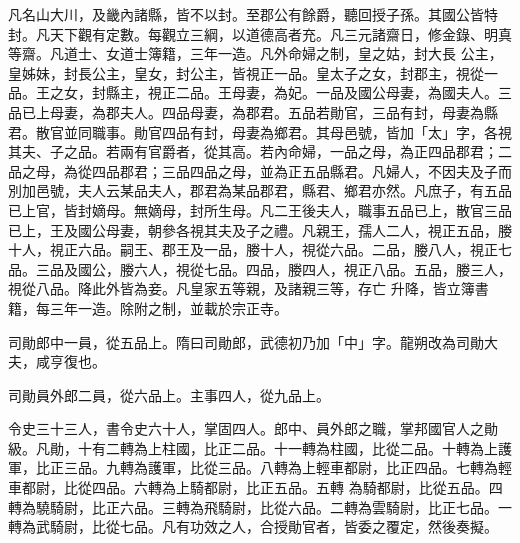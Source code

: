 \begin{pinyinscope}
 凡名山大川，及畿內諸縣，皆不以封。至郡公有餘爵，聽回授子孫。其國公皆特封。凡天下觀有定數。每觀立三綱，以道德高者充。凡三元諸齋日，修金錄、明真等齋。凡道士、女道士簿籍，三年一造。凡外命婦之制，皇之姑，封大長
 公主，皇姊妹，封長公主，皇女，封公主，皆視正一品。皇太子之女，封郡主，視從一品。王之女，封縣主，視正二品。王母妻，為妃。一品及國公母妻，為國夫人。三品已上母妻，為郡夫人。四品母妻，為郡君。五品若勛官，三品有封，母妻為縣君。散官並同職事。勛官四品有封，母妻為鄉君。其母邑號，皆加「太」字，各視其夫、子之品。若兩有官爵者，從其高。若內命婦，一品之母，為正四品郡君；二品之母，為從四品郡君；三品四品之母，並為正五品縣君。凡婦人，不因夫及子而
 別加邑號，夫人云某品夫人，郡君為某品郡君，縣君、鄉君亦然。凡庶子，有五品已上官，皆封嫡母。無嫡母，封所生母。凡二王後夫人，職事五品已上，散官三品已上，王及國公母妻，朝參各視其夫及子之禮。凡親王，孺人二人，視正五品，媵十人，視正六品。嗣王、郡王及一品，媵十人，視從六品。二品，媵八人，視正七品。三品及國公，媵六人，視從七品。四品，媵四人，視正八品。五品，媵三人，視從八品。降此外皆為妾。凡皇家五等親，及諸親三等，存亡
 升降，皆立簿書籍，每三年一造。除附之制，並載於宗正寺。



 司勛郎中一員，從五品上。隋曰司勛郎，武德初乃加「中」字。龍朔改為司勛大夫，咸亨復也。



 司勛員外郎二員，從六品上。主事四人，從九品上。



 令史三十三人，書令史六十人，掌固四人。郎中、員外郎之職，掌邦國官人之勛級。凡勛，十有二轉為上柱國，比正二品。十一轉為柱國，比從二品。十轉為上護軍，比正三品。九轉為護軍，比從三品。八轉為上輕車都尉，比正四品。七轉為輕車都尉，比從四品。六轉為上騎都尉，比正五品。五轉
 為騎都尉，比從五品。四轉為驍騎尉，比正六品。三轉為飛騎尉，比從六品。二轉為雲騎尉，比正七品。一轉為武騎尉，比從七品。凡有功效之人，合授勛官者，皆委之覆定，然後奏擬。




\end{pinyinscope}
